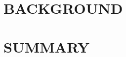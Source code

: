 \documentclass[12pt,letterpaper]{article}
\begin{document}
\section*{BACKGROUND}

% 
%

\section*{SUMMARY}

%
%
\end{document}
